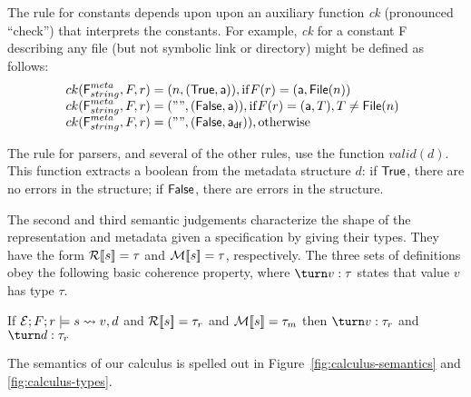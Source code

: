 The rule for constants depends upon upon
an auxiliary function {\it ck} (pronounced ``check'')
that interprets the constants.
For example, {\it ck} for a constant {\sf F} describing any file
(but not symbolic link or directory) might be defined as follows:
\[
\begin{array}{@{}l}
ck(\mbox{\sf F}^{\metapdty}_{\stringty},F,r) = (n,(\True,\att)), \mathrm{if } F(r) = (\att,\File{n}) \\
ck(\mbox{\sf F}^{\metapdty}_{\stringty},F,r) = ("",(\False,\att)), \mathrm{if } F(r) = (\att,T), T \not=\File{n} \\
ck(\mbox{\sf F}^{\metapdty}_{\stringty},F,r) = ("",(\False,\defaultatt)), \mathrm{otherwise}
\end{array}
\]

The rule for \padshaskell{} parsers, and several of the other rules,
use the function $valid(d)$.  This function extracts a boolean from the
metadata structure $d$: if $\mathsf{True}$, there are no errors in the structure;
if $\mathsf{False}$, there are errors in the structure.

The second and third
semantic judgements characterize the shape of the representation and metadata
given a specification by giving their types.  They have the form ${\cal R}[\![ s ]\!] = \tau$ and
${\cal M}[\![ s ]\!] = \tau$, respectively.  The three sets of definitions obey the following
basic coherence property, where $\turn v : \tau$ states that value $v$ has type $\tau$.

\begin{proposition}
If $\mathcal{E};F;r \models s \rightsquigarrow v,d$ and
${\cal R}[\![ s ]\!] = \tau_r$ and ${\cal M}[\![ s ]\!] = \tau_m$
then $\turn v : \tau_r$ and $\turn d : \tau_r$ 
\end{proposition}


The semantics of our calculus is spelled out in Figure~\ref{fig:calculus-semantics} 
and \ref{fig:calculus-types}.

